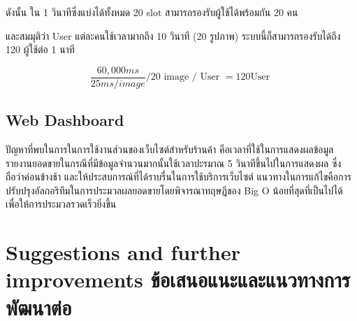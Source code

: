 ดังนั้น ใน 1 วินาทีซึ่งแบ่งได้ทั้งหมด 20  slot สามารถรองรับผู้ใช้ได้พร้อมกัน 20 คน

และสมมุติว่า User แต่ละคนใช้เวลามากถึง 10 วินาที (20 รูปภาพ) ระบบนี้ก็สามารถรองรับได้ถึง 120 ผู้ใช้ต่อ 1 นาที 


\begin{equation}
    {\frac {60,000 ms}{25 ms / image}}   / 20 \text{ image / User }  = 120 \text{User }
\end{equation}
 
\subsection{Web Dashboard}
ปัญหาที่พบในการในการใช้งานส่วนของเว็บไซต์สำหรับร้านค้า คือเวลาที่ใช้ในการแสดงผลข้อมูลรายงานยอดขายในกรณีที่มีข้อมูลจำนวนมากนั้นใช้เวลาปะรมาณ 5 วินาทีขึ้นไปในการแสดงผล ซึ่งถือว่าค่อนข้างช้า และให้ประสบการณ์ที่ได้ราบรื่นในการใช้บริการเว็บไซต์ แนวทางในการแก้ไขคือการปรับปรุงอัลกอริทึมในการประมวลผลยอดขายโดยพิจารณาทฤษฎีของ Big O น้อยที่สุดที่เป็นไปได้ เพื่อให้การประมวลรวดเร็วยิ่งขึ้น 



\section{\ifenglish%
      Suggestions and further improvements
  \else%
      ข้อเสนอแนะและแนวทางการพัฒนาต่อ
  \fi
 }


